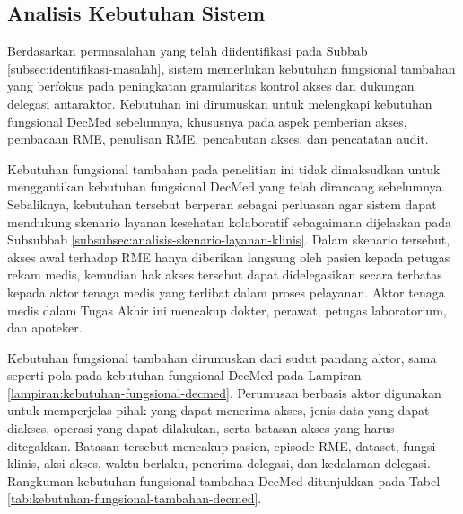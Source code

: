\subsection{Analisis Kebutuhan Sistem}
\label{subsec:analisis-kebutuhan-sistem}

Berdasarkan permasalahan yang telah diidentifikasi pada Subbab \ref{subsec:identifikasi-masalah}, sistem memerlukan kebutuhan fungsional tambahan yang berfokus pada peningkatan granularitas kontrol akses dan dukungan delegasi antaraktor. Kebutuhan ini dirumuskan untuk melengkapi kebutuhan fungsional DecMed sebelumnya, khususnya pada aspek pemberian akses, pembacaan RME, penulisan RME, pencabutan akses, dan pencatatan audit.

Kebutuhan fungsional tambahan pada penelitian ini tidak dimaksudkan untuk menggantikan kebutuhan fungsional DecMed yang telah dirancang sebelumnya. Sebaliknya, kebutuhan tersebut berperan sebagai perluasan agar sistem dapat mendukung skenario layanan kesehatan kolaboratif sebagaimana dijelaskan pada Subsubbab \ref{subsubsec:analisis-skenario-layanan-klinis}. Dalam skenario tersebut, akses awal terhadap RME hanya diberikan langsung oleh pasien kepada petugas rekam medis, kemudian hak akses tersebut dapat didelegasikan secara terbatas kepada aktor tenaga medis yang terlibat dalam proses pelayanan. Aktor tenaga medis dalam Tugas Akhir ini mencakup dokter, perawat, petugas laboratorium, dan apoteker.

Kebutuhan fungsional tambahan dirumuskan dari sudut pandang aktor, sama seperti pola pada kebutuhan fungsional DecMed pada Lampiran \ref{lampiran:kebutuhan-fungsional-decmed}. Perumusan berbasis aktor digunakan untuk memperjelas pihak yang dapat menerima akses, jenis data yang dapat diakses, operasi yang dapat dilakukan, serta batasan akses yang harus ditegakkan. Batasan tersebut mencakup pasien, episode RME, dataset, fungsi klinis, aksi akses, waktu berlaku, penerima delegasi, dan kedalaman delegasi. Rangkuman kebutuhan fungsional tambahan DecMed ditunjukkan pada Tabel \ref{tab:kebutuhan-fungsional-tambahan-decmed}.

